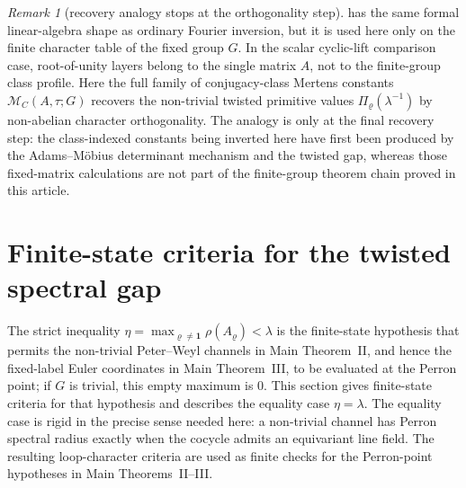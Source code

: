 \documentclass[11pt,a4paper]{amsart}
\theoremstyle{plain}
\theoremstyle{definition}
\theoremstyle{remark}
\newtheorem{remark}[theorem]{Remark}
\begin{document}
\begin{remark}[recovery analogy stops at the orthogonality step]
  \label{rem:recovery-analogy-orthogonality-step}
  \label{rem:readout-analogy-orthogonality-step}
   has the same formal linear-algebra
  shape as ordinary Fourier inversion, but it is used here only on the
  finite character table of the fixed group \(G\).  In the scalar
  cyclic-lift comparison case, root-of-unity layers belong to the single
  matrix \(A\), not to the finite-group class profile.
  Here the full family of
  conjugacy-class Mertens constants \(\mathcal M_C(A,\tau;G)\) recovers
  the non-trivial twisted
  primitive values \(\Pi_\varrho(\lambda^{-1})\) by non-abelian
  character orthogonality. The analogy is only at the final recovery
  step: the class-indexed constants being inverted here have first been
  produced by the
  Adams--M\"obius determinant mechanism and the twisted gap, whereas
  those fixed-matrix calculations are not part of the finite-group theorem
  chain proved in this article.
\end{remark}

\section{Finite-state criteria for the twisted spectral gap}
\label{sec:eta-gap}

The strict inequality
\(\eta=\max_{\varrho\neq\mathbf 1}\rho(A_\varrho)<\lambda\) is the
finite-state hypothesis that permits the non-trivial Peter--Weyl channels in
Main Theorem~II, and hence the fixed-label Euler coordinates in Main
Theorem~III, to be evaluated at the Perron point; if \(G\) is trivial, this
empty maximum is \(0\).  This section gives finite-state criteria for that hypothesis and describes the equality case
\(\eta=\lambda\).  The equality case is rigid in the precise sense needed
here: a non-trivial channel has Perron spectral radius exactly when the
cocycle admits an equivariant line field.  The resulting loop-character
criteria are used as finite checks for the Perron-point hypotheses in Main
Theorems~II--III.
\end{document}
